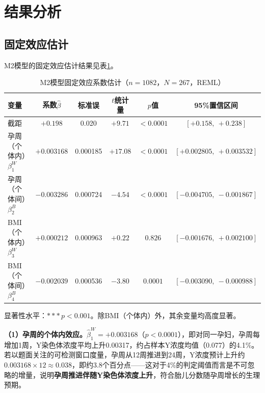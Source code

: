 \documentclass[12pt,a4paper]{ctexart}
\begin{document}
\section{结果分析}

\subsection{固定效应估计}

M2模型的固定效应估计结果见表\ref{tab:coef}。

\begin{table}[htbp]
\centering
\caption{M2模型固定效应系数估计（$n=1082$，$N=267$，REML）}
\label{tab:coef}
\begin{threeparttable}
\begin{tabular}{lccccc}
\toprule
变量 & 系数$\hat{\beta}$ & 标准误 & $t$统计量 & $p$值 & 95\%置信区间 \\
\midrule
截距 & $+0.198$ & 0.020 & $+9.71$ & $<0.0001$ & $[+0.158,\ +0.238]$ \\
孕周（个体内）$\beta_1^W$ & $+0.003168$ & 0.000185 & $+17.08$ & $<0.0001$ & $[+0.002805,\ +0.003532]$ \\
孕周（个体间）$\beta_2^B$ & $-0.003286$ & 0.000724 & $-4.54$ & $<0.0001$ & $[-0.004705,\ -0.001867]$ \\
BMI（个体内）$\beta_3^W$ & $+0.000212$ & 0.000963 & $+0.22$ & $0.826$ & $[-0.001676,\ +0.002100]$ \\
BMI（个体间）$\beta_4^B$ & $-0.002039$ & 0.000536 & $-3.80$ & $0.0001$ & $[-0.003090,\ -0.000988]$ \\
\bottomrule
\end{tabular}
\begin{tablenotes}
\item 显著性水平：$***\,p<0.001$。除BMI（个体内）外，其余变量均高度显著。
\end{tablenotes}
\end{threeparttable}
\end{table}

\textbf{（1）孕周的个体内效应。}$\hat{\beta}_1^W=+0.003168$（$p<0.0001$），即对同一孕妇，孕周每增加1周，Y染色体浓度平均上升0.00317，约占样本Y浓度均值（0.077）的4.1\%。若以题面关注的可检测窗口度量，孕周从12周推进到24周，Y浓度预计上升约$0.003168\times12\approx0.038$，即约3.8个百分点——这对于4\%的判定阈值而言是不可忽略的增量，说明\textbf{孕周推进伴随Y染色体浓度上升}，符合胎儿分数随孕周增长的生理预期。
\end{document}

